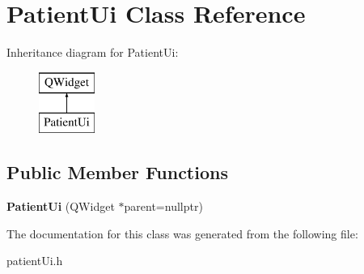 \hypertarget{class_patient_ui}{}\section{Patient\+Ui Class Reference}
\label{class_patient_ui}
Inheritance diagram for Patient\+Ui\+:\begin{figure}[H]
\begin{center}
\leavevmode
\includegraphics[height=2.000000cm]{class_patient_ui}
\end{center}
\end{figure}
\subsection*{Public Member Functions}
\begin{DoxyCompactItemize}
\item 
\mbox{\label{class_patient_ui_a92c1135468e864db7c002026097c21e9}} 
{\bfseries Patient\+Ui} (Q\+Widget $\ast$parent=nullptr)
\end{DoxyCompactItemize}


The documentation for this class was generated from the following file\+:\begin{DoxyCompactItemize}
\item 
patient\+Ui.\+h\end{DoxyCompactItemize}
